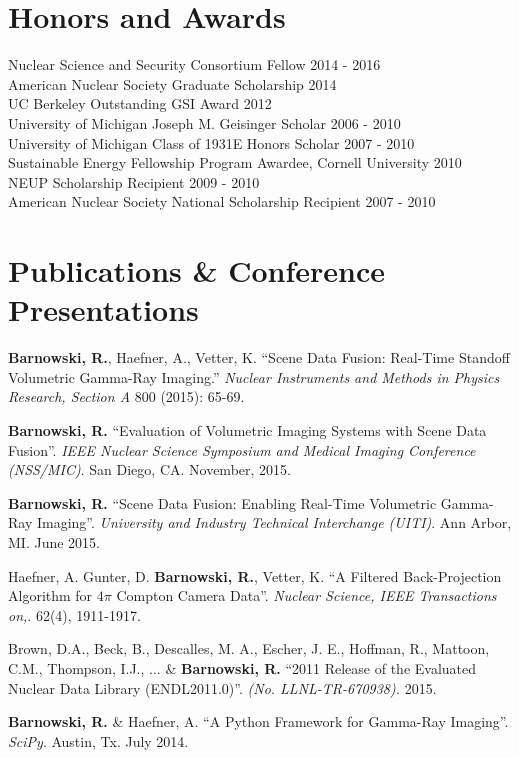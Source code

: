 \documentclass[margin,line]{res}
\begin{document}
\begin{resume}
\section{\sc Honors and Awards} 

Nuclear Science and Security Consortium Fellow \hfill 2014 - 2016 \\
American Nuclear Society Graduate Scholarship \hfill 2014 \\
UC Berkeley Outstanding GSI Award \hfill 2012 \\
University of Michigan Joseph M. Geisinger Scholar \hfill 2006 - 2010 \\
University of Michigan Class of 1931E Honors Scholar \hfill 2007 - 2010 \\
Sustainable Energy Fellowship Program Awardee, Cornell University \hfill 2010 \\
NEUP Scholarship Recipient \hfill 2009 - 2010 \\
American Nuclear Society National Scholarship Recipient \hfill 2007 - 2010 \\

\section{\sc Publications \& Conference Presentations}

{\bf Barnowski, R.}, Haefner, A., Vetter, K. ``Scene Data Fusion: Real-Time
Standoff Volumetric Gamma-Ray Imaging.'' {\it Nuclear Instruments and Methods
in Physics Research, Section A} 800 (2015): 65-69.

{\bf Barnowski, R.} ``Evaluation of Volumetric Imaging Systems with Scene Data
Fusion''. {\it IEEE Nuclear Science Symposium and Medical Imaging Conference
(NSS/MIC)}. San Diego, CA. November, 2015.

{\bf Barnowski, R.} ``Scene Data Fusion: Enabling Real-Time Volumetric
Gamma-Ray Imaging''. {\it University and Industry Technical Interchange (UITI)}.
Ann Arbor, MI. June 2015.

Haefner, A. Gunter, D. {\bf Barnowski, R.}, Vetter, K. ``A Filtered
Back-Projection Algorithm for $4\pi$ Compton Camera Data''. {\it Nuclear 
Science, IEEE Transactions on,}. 62(4), 1911-1917.

Brown, D.A., Beck, B., Descalles, M. A., Escher, J. E., Hoffman, R., Mattoon,
C.M., Thompson, I.J., ... \& {\bf Barnowski, R.} ``2011 Release of the
Evaluated Nuclear Data Library (ENDL2011.0)''. {\it(No. LLNL-TR-670938).} 2015.

{\bf Barnowski, R.} \& Haefner, A. ``A Python Framework for Gamma-Ray Imaging''.
{\it SciPy}. Austin, Tx. July 2014.


\end{resume}
\end{document}

